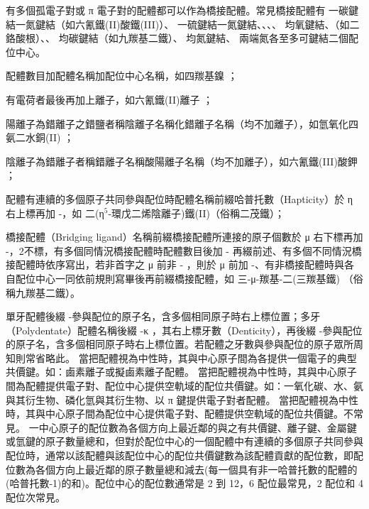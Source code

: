 \documentclass[a4paper,12pt]{report}
\begin{document}
有多個孤電子對或 π 電子對的配體都可以作為橋接配體。常見橋接配體有  一碳鍵結一氮鍵結（如六氰鐵(II)酸鐵(III)）、 一硫鍵結一氮鍵結、、、、 均氧鍵結、（如二鉻酸根）、、 均碳鍵結（如九羰基二鐵）、 均氮鍵結、 兩端氮各至多可鍵結二個配位中心。
\bit
\item 配體數目加配體名稱加配位中心名稱，如四羰基鎳 \ce{[Ni(CO)4]}；
\item 有電荷者最後再加上離子，如六氰鐵(II)離子 ；
\item 陽離子為錯離子之錯鹽者稱陰離子名稱化錯離子名稱（均不加離子），如氫氧化四氨二水銅(II) ；
\item 陰離子為錯離子者稱錯離子名稱酸陽離子名稱（均不加離子），如六氰鐵(III)酸鉀 ；
\item 配體有連續的多個原子共同參與配位時配體名稱前綴哈普托數（Hapticity）於 η 右上標再加 -，如 二(η$^5$-環戊二烯陰離子)鐵(II)（俗稱二茂鐵）；
\item 橋接配體（Bridging ligand）名稱前綴橋接配體所連接的原子個數於 μ 右下標再加 -，2不標，有多個同情況橋接配體時配體數目後加 - 再綴前述、有多個不同情況橋接配體時依序寫出，若非首字之 μ 前非 - ，則於 μ 前加 -、有非橋接配體時與各自配位中心一同依前規則寫畢後再前綴橋接配體，如 三-μ-羰基-二(三羰基鐵) （俗稱九羰基二鐵）。
\item 單牙配體後綴 -參與配位的原子名，含多個相同原子時右上標位置；多牙（Polydentate）配體名稱後綴 -κ ，其右上標牙數（Denticity），再後綴 -參與配位的原子名，含多個相同原子時右上標位置。若配體之牙數與參與配位的原子眾所周知則常省略此。
\eit
{}
當把配體視為中性時，其與中心原子間為各提供一個電子的典型共價鍵。如：鹵素離子或擬鹵素離子配體。
當把配體視為中性時，其與中心原子間為配體提供電子對、配位中心提供空軌域的配位共價鍵。如：一氧化碳、水、氨與其衍生物、磷化氫與其衍生物、以 π 鍵提供電子對者配體。
當把配體視為中性時，其與中心原子間為配位中心提供電子對、配體提供空軌域的配位共價鍵。不常見。
一中心原子的配位數為各個方向上最近鄰的與之有共價鍵、離子鍵、金屬鍵或氫鍵的原子數量總和，但對於配位中心的一個配體中有連續的多個原子共同參與配位時，通常以該配體與該配位中心的配位共價鍵數為該配體貢獻的配位數，即配位數為各個方向上最近鄰的原子數量總和減去(每一個具有非一哈普托數的配體的(哈普托數-1)的和)。配位中心的配位數通常是 2 到 12，6 配位最常見，2 配位和 4 配位次常見。
\end{document}
